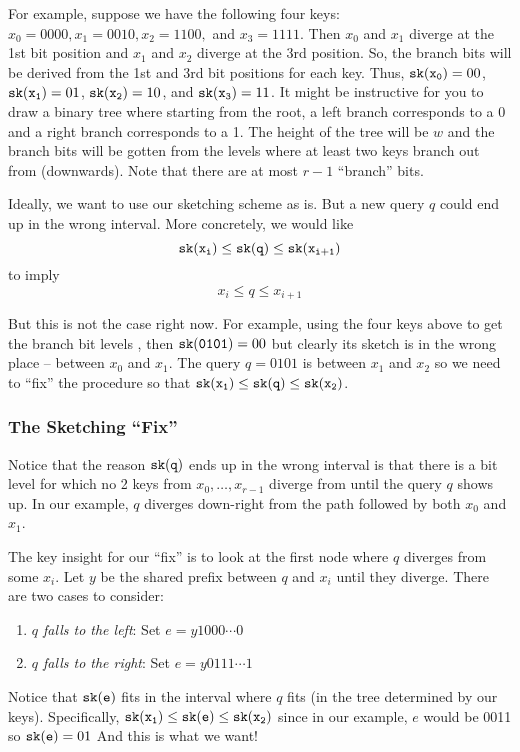 \documentclass[11pt]{article}
\newcommand{\sk}[1]{{\tt{sk}(#1)}}
\begin{document}
For example, suppose we have the following four keys:
$x_0 = 0000, x_1 = 0010, x_2 = 1100, $ and $x_3 = 1111$.
Then $x_0$ and $x_1$ diverge at the 1st bit position and
$x_1$ and $x_2$ diverge at the 3rd position.
So, the branch bits will be derived from the 1st and 3rd bit positions
for each key. Thus,
$\sk{x_0} = 00$, $\sk{x_1} = 01$, $\sk{x_2} = 10$, and
$\sk{x_3} = 11$. It might be instructive for you to draw a binary tree
where starting from the root, a left branch corresponds to a 0 and a
right branch corresponds to a 1. The height of the tree will be $w$ and
the branch bits will be gotten from the levels where at least two
keys branch out from (downwards).
Note that there are at most $r-1$ ``branch'' bits.

Ideally, we want to use our sketching scheme as is. But a new query $q$
could end up in the wrong interval. More concretely, we would like
$$
\sk{x_i} \leq \sk{q} \leq \sk{x_{i+1}}
$$
to imply
$$
x_i \leq q \leq x_{i+1}
$$

But this is not the case right now. For example, using the four keys above
to get the branch bit levels , then $\sk{0101} = 00$ but clearly
its sketch is in the wrong place -- between $x_0$ and $x_1$.
The query $q=0101$
is between $x_1$ and $x_2$ so we need to ``fix'' the procedure so that
$\sk{x_1} \leq \sk{q} \leq \sk{x_2}$.

\subsubsection{The Sketching ``Fix''}

Notice that the reason $\sk{q}$ ends up in the wrong interval
is that there is a bit level for which no 2 keys from
$x_0, \ldots, x_{r-1}$ diverge from until the query $q$ shows up. In our
example, $q$ diverges down-right from the path followed by both
$x_0$ and $x_1$.

The key insight for our ``fix''
is to look at the first node where $q$ diverges from
some $x_i$. Let $y$ be the shared prefix between $q$ and $x_i$ until they
diverge. There are two cases to consider:
\begin{enumerate}
\item
  \textit{$q$ falls to the left}:
  Set $e = y1000\cdots0$
\item
  \textit{$q$ falls to the right}:
  Set $e = y0111\cdots1$
\end{enumerate}

Notice that $\sk{e}$ fits in the interval where $q$ fits (in the tree
determined by our keys). Specifically, $\sk{x_1} \leq \sk{e} \leq \sk{x_2}$
since
in our example, $e$ would be 0011 so $\sk{e} = 01$
And this is what we want!
\end{document}

